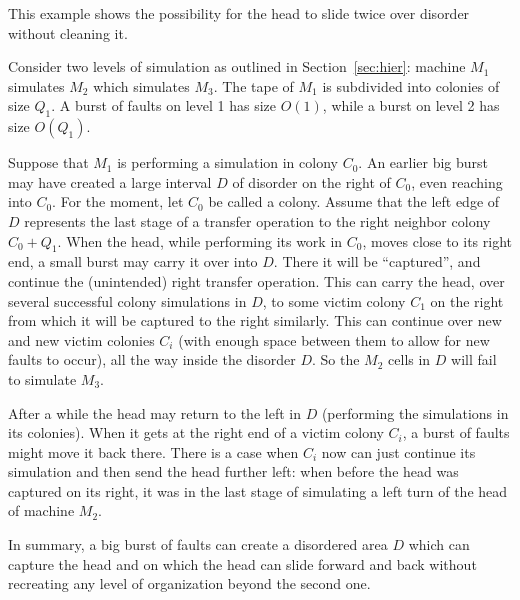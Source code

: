 \documentclass[11pt]{memoir}
\theoremstyle{definition} %
\newcommand{\Q}{Q} %
\begin{document}
\begin{example}
  This example shows the possibility for the head to slide twice over disorder without cleaning it.
  
Consider two levels of simulation as outlined in Section~\ref{sec:hier}: 
machine \( M_{1} \) simulates \( M_{2} \) which simulates \( M_{3} \).
The tape of \( M_{1} \) is subdivided into colonies of size \( \Q_{1} \).
A burst of faults on level 1 has size \( O(1) \), while a burst on level 2 has size \( O(\Q_{1}) \).

Suppose that \( M_{1} \) is performing a simulation in colony \( C_{0} \).
An earlier big burst may have created a large interval \( D \) of disorder
on the right of \( C_{0} \), even reaching into \( C_{0} \).
For the moment, let \( C_{0} \) be called a  colony.
Assume that the left edge of \( D \) represents the last stage of a transfer operation to the right neighbor 
colony \( C_{0}+Q_{1} \).
When the head, while performing its work in \( C_{0} \), moves close to its right end, a small burst may 
carry it over into \( D \).
There it will be ``captured'', and continue the (unintended) right transfer operation.
This can carry the head, over several successful colony simulations in \( D \), to some
victim colony \( C_{1} \) on the right from which it will be captured to the right similarly.
This can continue over new and new victim colonies \( C_{i} \) (with enough space between them to
allow for new faults to occur), all the way inside the disorder \( D \).
So the \( M_{2} \) cells in \( D \) will fail to simulate \( M_{3} \).

After a while the head may return to the left in \( D \)
(performing the simulations in its colonies).
When it gets at the right end of a victim colony \( C_{i} \), a burst of faults might move it back there.
There is a case when \( C_{i} \) now can just continue its simulation and then send the head
further left: when before the head was captured on its right,
it was in the last stage of simulating a left turn of the head of machine \( M_{2} \).

In summary, 
a big burst of faults
can create a disordered area \( D \) which can capture the head and on which the head can slide
forward and back without recreating any level of organization beyond the second one.
\end{example}
\end{document}

